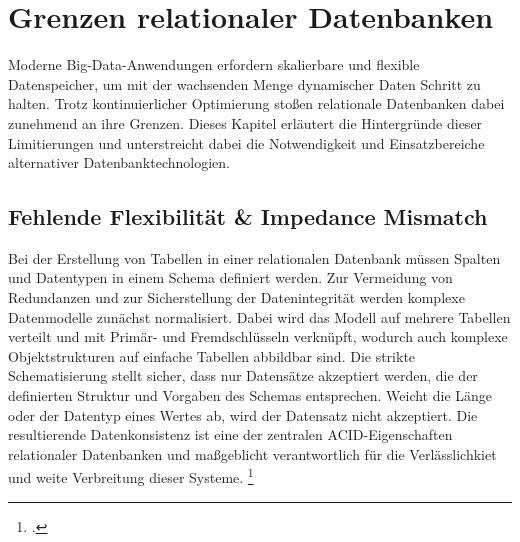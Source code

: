 \section{Grenzen relationaler Datenbanken}


Moderne Big-Data-Anwendungen erfordern skalierbare und flexible Datenspeicher, um mit der wachsenden Menge dynamischer Daten Schritt zu halten. Trotz kontinuierlicher Optimierung stoßen relationale Datenbanken dabei zunehmend an ihre Grenzen. Dieses Kapitel erläutert die Hintergründe dieser Limitierungen und unterstreicht dabei die Notwendigkeit und Einsatzbereiche alternativer Datenbanktechnologien.

\subsection{Fehlende Flexibilität \& Impedance Mismatch}

Bei der Erstellung von Tabellen in einer relationalen Datenbank müssen Spalten und Datentypen in einem Schema definiert werden. Zur Vermeidung von Redundanzen und zur Sicherstellung der Datenintegrität werden komplexe Datenmodelle zunächst normalisiert. Dabei wird das Modell auf mehrere Tabellen verteilt und mit Primär- und Fremdschlüsseln verknüpft, wodurch auch komplexe Objektstrukturen auf einfache Tabellen abbildbar sind. Die strikte Schematisierung stellt sicher, dass nur Datensätze akzeptiert werden, die der definierten Struktur und Vorgaben des Schemas entsprechen. Weicht die Länge oder der Datentyp eines Wertes ab, wird der Datensatz nicht akzeptiert. Die resultierende Datenkonsistenz ist eine der zentralen ACID-Eigenschaften relationaler Datenbanken und maßgeblicht verantwortlich für die Verlässlichkiet und weite Verbreitung dieser Systeme. \footcite[S. 3]{phiriComparativeStudyNoSQL2017}

